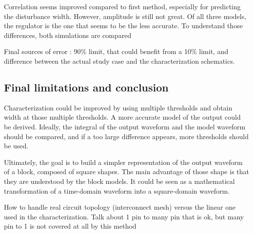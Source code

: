 Correlation seems improved compared to first method, especially for predicting the disturbance width.
However, amplitude is still not great.
Of all three models, the regulator is the one that seems to be the less accurate.
To understand those differences, both simulations are compared



Final sources of error : 90\% limit, that could benefit from a 10\% limit, and difference between the actual study case and the characterization schematics.

\subsection{Final limitations and conclusion}

Characterization could be improved by using multiple thresholds and obtain width at those multiple thresholds.
A more accurate model of the output could be derived.
Ideally, the integral of the output waveform and the model waveform should be compared, and if a too large difference appears, more thresholds should be used.


Ultimately, the goal is to build a simpler representation of the output waveform of a block, composed of square shapes.
The main advantage of those shape is that they are understood by the block models.
It could be seen as a mathematical transformation of a time-domain waveform into a square-domain waveform.

How to handle real circuit topology (interconnect mesh) versus the linear one used in the characterization.
Talk about 1 pin to many pin that is ok, but many pin to 1 is not covered at all by this method
